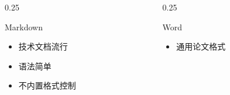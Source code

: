 \begin{frame}

  \frametitle{}

  \begin{columns}[t]

    \begin{column}{0.25\textwidth}

      \begin{exampleblock}{Markdown}

        \begin{itemize}

          \item[\faPlus] 技术文档流行

          \item[\faPlus] 语法简单

          \item[\faMinus] 不内置格式控制

        \end{itemize}

      \end{exampleblock}


    \end{column}

    \begin{column}{0.25\textwidth}

      \begin{exampleblock}{Word}

        \begin{itemize}

          \item[\faPlus] 通用论文格式


\end{itemize}
\end{exampleblock}
\end{column}
\end{columns}
\end{frame}
